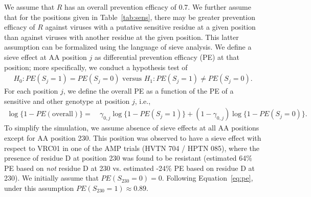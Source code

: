 \documentclass[10pt]{article}
\begin{document}
We assume that $R$ has an overall prevention efficacy of 0.7. We further assume that for the positions given in Table~\ref{tab:sens}, there may be greater prevention efficacy of $R$ against viruses with a putative sensitive residue at a given position than against viruses with another residue at the given position. This latter assumption can be formalized using the language of sieve analysis. We define a sieve effect at AA position $j$ as differential prevention efficacy (PE) at that position; more specifically, we conduct a hypothesis test of
\begin{align*}
  H_0: PE(S_j = 1) = PE(S_j = 0) \text{ versus } H_1: PE(S_j = 1) \neq PE(S_j = 0).
\end{align*}
For each position $j$, we define the overall PE as a function of the PE of a sensitive and other genotype at position $j$, i.e.,
\begin{align}
  \log \{1 - PE(\text{overall})\} =& \ \gamma_{0,j} \log \{1 - PE(S_j = 1)\} + (1 - \gamma_{0,j}) \log \{1 - PE(S_j = 0)\}. \label{eq:pe}
\end{align}
To simplify the simulation, we assume absence of sieve effects at all AA positions except for AA position 230. This position was observed to have a sieve effect with respect to VRC01 in one of the AMP trials (HVTN 704 / HPTN 085), where the presence of residue D at position 230 was found to be resistant (estimated 64\% PE based on \emph{not} residue D at 230 vs. estimated -24\% PE based on residue D at 230). We initially assume that $PE(S_{230} = 0) = 0$. Following Equation~\eqref{eq:pe}, under this assumption $PE(S_{230} = 1) \approx 0.89$.
\end{document}
